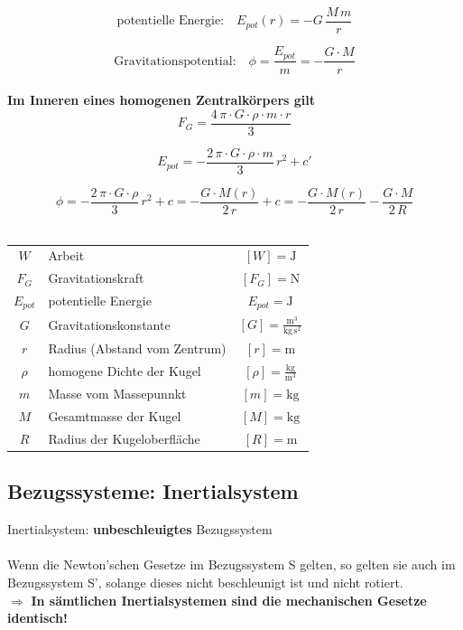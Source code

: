 	$$ \boxed{ \text{potentielle Energie:} \quad E_{pot}(r) = -G \, \frac{M \, m}{r} }$$ 
	
	$$ \boxed{ \text{Gravitationspotential:} \quad \phi = \frac{E_{pot}}{m} = - \frac{G \cdot M}{r}}  $$ \\
	
	
	
	
	\textbf{Im Inneren eines homogenen Zentralkörpers gilt} \\
	
	$$ \boxed{ F_G = \frac{4 \, \pi \cdot G \cdot \rho \cdot m \cdot r}{3} }$$ 
	
	$$ \boxed{ E_{pot} = - \frac{2 \,  \pi \cdot G \cdot \rho \cdot m}{3} \, r^2 + c' } $$
	
	$$ \boxed{ \phi = - \frac{2 \,  \pi \cdot G \cdot \rho}{3} \, r^2 + c = - \frac{G \cdot M(r)}{2 \, r}  + c = - \frac{G \cdot M(r)}{2 \, r} - \frac{G \cdot M}{2 \, R} } $$ \\
	
	
	\begin{tabular}{c l c}
	$W$ & Arbeit & $[W] = \mathrm{J} $ \\
	$F_G$ & Gravitationskraft & $[F_G] = \mathrm{N}$ \\
	$E_{pot}$ & potentielle Energie & $E_{pot} = \mathrm{J}$ \\
	$G$ & Gravitationskonstante & $[G] = \mathrm{\frac{m^3}{kg \, s^2}}$ \\	
	$r$ & Radius (Abstand vom Zentrum) & $[r] = \mathrm{m}$ \\
	$\rho$ & homogene Dichte der Kugel & $[\rho] = \mathrm{\frac{kg}{m^3}}$ \\
	$m$ & Masse vom Massepunnkt & $[m] = \mathrm{kg}$ \\
	$M$ & Gesamtmasse der Kugel & $[M] = \mathrm{kg}$ \\
	$R$ & Radius der Kugeloberfläche & $[R] = \mathrm{m}$ \\
	\end{tabular}
	

	
	\vfill\null
	\pagebreak
	
	
	
	\subsection{Bezugssysteme: Inertialsystem}
	Inertialsystem: \textbf{unbeschleuigtes} Bezugssystem \\
	\\
	Wenn die Newton'schen Gesetze im Bezugssystem S gelten, so gelten sie auch im Bezugssystem S', solange dieses nicht beschleunigt ist und nicht rotiert. \\
	$\Rightarrow$ \textbf{In sämtlichen Inertialsystemen sind die mechanischen Gesetze identisch!} \\
	
